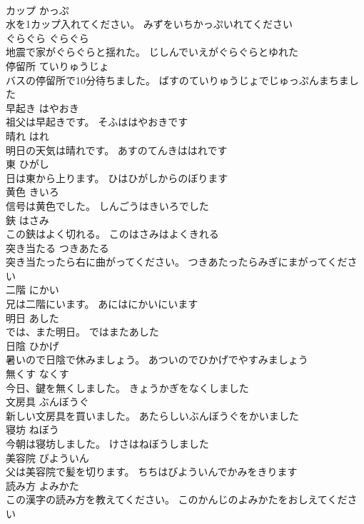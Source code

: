 \documentclass[8pt]{extreport}
\begin{document}
\begin{CJK}{UTF8}{min}
\\	カップ	かっぷ	
\\	水を1カップ入れてください。	みずをいちかっぷいれてください	
\\	ぐらぐら	ぐらぐら	
\\	地震で家がぐらぐらと揺れた。	じしんでいえがぐらぐらとゆれた	
\\	停留所	ていりゅうじょ	
\\	バスの停留所で10分待ちました。	ばすのていりゅうじょでじゅっぷんまちました	
\\	早起き	はやおき	
\\	祖父は早起きです。	そふははやおきです	
\\	晴れ	はれ	
\\	明日の天気は晴れです。	あすのてんきははれです	
\\	東	ひがし	
\\	日は東から上ります。	ひはひがしからのぼります	
\\	黄色	きいろ	
\\	信号は黄色でした。	しんごうはきいろでした	
\\	鋏	はさみ	
\\	この鋏はよく切れる。	このはさみはよくきれる	
\\	突き当たる	つきあたる	
\\	突き当たったら右に曲がってください。	つきあたったらみぎにまがってください	
\\	二階	にかい	
\\	兄は二階にいます。	あにはにかいにいます	
\\	明日	あした	
\\	では、また明日。	ではまたあした	
\\	日陰	ひかげ	
\\	暑いので日陰で休みましょう。	あついのでひかげでやすみましょう	
\\	無くす	なくす	
\\	今日、鍵を無くしました。	きょうかぎをなくしました	
\\	文房具	ぶんぼうぐ	
\\	新しい文房具を買いました。	あたらしいぶんぼうぐをかいました	
\\	寝坊	ねぼう	
\\	今朝は寝坊しました。	けさはねぼうしました	
\\	美容院	びよういん	
\\	父は美容院で髪を切ります。	ちちはびよういんでかみをきります	
\\	読み方	よみかた	
\\	この漢字の読み方を教えてください。	このかんじのよみかたをおしえてください	

\end{CJK}
\end{document}
